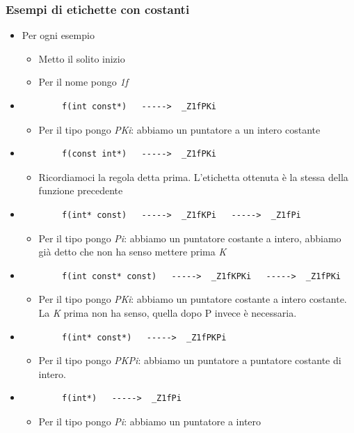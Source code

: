 \subsubsection{Esempi di etichette con costanti}
\begin{itemize}
	\item Per ogni esempio
	\begin{itemize}
		\item Metto il solito inizio
		\item Per il nome pongo \emph{1f}
	\end{itemize}
	\item \begin{verbatim}
		f(int const*)   ----->  _Z1fPKi
	\end{verbatim}
	\begin{itemize}
		\item Per il tipo pongo \emph{PKi}: abbiamo un puntatore a un intero costante
	\end{itemize}
	\item \begin{verbatim}
		f(const int*)   ----->  _Z1fPKi
	\end{verbatim}
	\begin{itemize}
		\item Ricordiamoci la regola detta prima. L'etichetta ottenuta è la stessa della funzione precedente
	\end{itemize}
	\item \begin{verbatim}
		f(int* const)   ----->  _Z1fKPi   ----->  _Z1fPi
	\end{verbatim}
	\begin{itemize}
		\item Per il tipo pongo \emph{Pi}: abbiamo un puntatore costante a intero, abbiamo già detto che non ha senso mettere prima \emph{K}
	\end{itemize}
	\item \begin{verbatim}
		f(int const* const)   ----->  _Z1fKPKi   ----->  _Z1fPKi
	\end{verbatim}
	\begin{itemize}
		\item Per il tipo pongo \emph{PKi}: abbiamo un puntatore costante a intero costante. La \emph{K} prima non ha senso, quella dopo P invece è necessaria.
	\end{itemize}
	\item \begin{verbatim}
		f(int* const*)   ----->  _Z1fPKPi
	\end{verbatim}
	\begin{itemize}
		\item Per il tipo pongo \emph{PKPi}: abbiamo un puntatore a puntatore costante di intero.
	\end{itemize}
	\item \begin{verbatim}
		f(int*)   ----->  _Z1fPi
	\end{verbatim}
	\begin{itemize}
		\item Per il tipo pongo \emph{Pi}: abbiamo un puntatore a intero
	\end{itemize}
\end{itemize}
